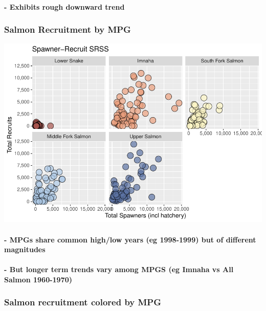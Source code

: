 \documentclass[]{article}
\let\oldparagraph\paragraph
\renewcommand{\paragraph}[1]{\oldparagraph{#1}\mbox{}}
\begin{document}
\hypertarget{exhibits-rough-downward-trend}{%
\paragraph{- Exhibits rough downward
trend}\label{exhibits-rough-downward-trend}}

\hypertarget{salmon-recruitment-by-mpg}{%
\subsubsection{Salmon Recruitment by
MPG}\label{salmon-recruitment-by-mpg}}

\includegraphics{0_EDM_Vis_Raw_files/figure-latex/unnamed-chunk-5-1.pdf}

\hypertarget{mpgs-share-common-highlow-years-eg-1998-1999-but-of-different-magnitudes}{%
\paragraph{- MPGs share common high/low years (eg 1998-1999) but of
different
magnitudes}\label{mpgs-share-common-highlow-years-eg-1998-1999-but-of-different-magnitudes}}

\hypertarget{but-longer-term-trends-vary-among-mpgs-eg-imnaha-vs-all-salmon-1960-1970}{%
\paragraph{- But longer term trends vary among MPGS (eg Imnaha vs All
Salmon
1960-1970)}\label{but-longer-term-trends-vary-among-mpgs-eg-imnaha-vs-all-salmon-1960-1970}}

\hypertarget{salmon-recruitment-colored-by-mpg}{%
\subsubsection{Salmon recruitment colored by
MPG}\label{salmon-recruitment-colored-by-mpg}}
\end{document}
